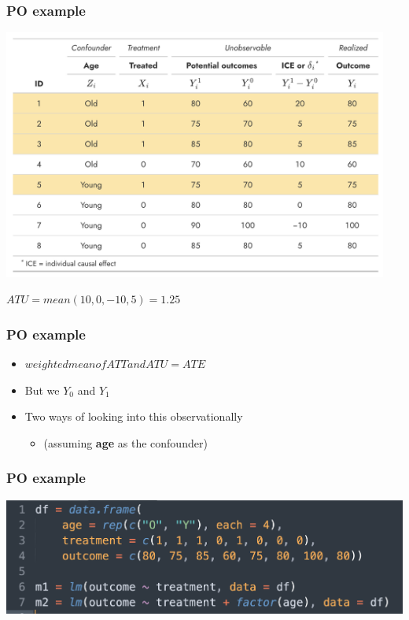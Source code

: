 \documentclass[aspectratio=43]{beamer}
\begin{document}
\begin{frame}
\frametitle{PO example}
\centering

\includegraphics[width = 0.95\textwidth]{../img/po_table_atu}

$ATU = mean(10, 0, -10, 5) = 1.25$
  
\end{frame}

\begin{frame}
\frametitle{PO example}
\centering

\begin{itemize}
  \item $weighted mean of ATT and ATU = ATE$
  \item But we  $Y_{0}$ and $Y_{1}$
  \item Two ways of looking into this observationally
  \begin{itemize}
    \item (assuming \textbf{age} as the  confounder)
  \end{itemize}
  
\end{itemize}

  
\end{frame}
  
\begin{frame}
\frametitle{PO example}
\centering

\includegraphics[width = \textwidth]{../img/po_data}

\end{frame}
\end{document}
